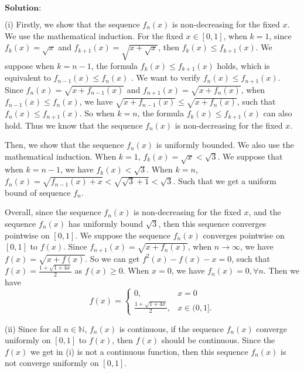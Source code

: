 \documentclass[12pt]{article}
\begin{document}
\vspace{8pt}
$\textbf{Solution:}$

(i) Firstly, we show that the sequence $f_{n}(x)$ is non-decreasing for the fixed $x$. We use the mathematical induction. For the fixed $x \in [0, 1]$, when $k = 1$, since $f_{k} (x) = \sqrt{x}$ and $f_{k+1} (x) = \sqrt{x + \sqrt{x}}$, then $f_{k}(x) \leq f_{k+1}(x)$. We suppose when $k = n-1$, the formula $f_{k}(x) \leq f_{k+1}(x)$ holds, which is equivalent to $f_{n-1}(x) \leq f_{n}(x)$ . We want to verify $f_{n}(x) \leq f_{n+1}(x)$. Since $f_{n}(x) = \sqrt{x + f_{n-1}(x)}$ and $f_{n+1}(x) = \sqrt{x + f_{n}(x)}$, when $f_{n-1}(x) \leq f_{n}(x)$, we have $\sqrt{x + f_{n-1}(x)} \leq \sqrt{x + f_{n}(x)}$, such that $f_{n}(x) \leq f_{n+1}(x)$. So when $k = n$, the formula $f_{k}(x) \leq f_{k+1}(x)$ can also hold. Thus we know that the sequence $f_{n}(x)$ is non-decreasing for the fixed $x$.

Then, we show that the sequence $f_{n}(x)$ is uniformly bounded. We also use the mathematical induction. When $k =1$, $f_{k}(x) = \sqrt{x} < \sqrt{3}$. We suppose that when $k = n-1$, we have $f_{k}(x) < \sqrt{3}$. When $k =n$, $f_{n}(x) = \sqrt{f_{n-1}(x) + x} < \sqrt{\sqrt{3}+1} < \sqrt{3}$. Such that we get a uniform bound of sequence $f_{n}$.

Overall, since the sequence $f_{n}(x)$ is non-decreasing for the fixed $x$, and the sequence $f_{n}(x)$ has uniformly bound $\sqrt{3}$, then this sequence converges pointwise on $[0, 1]$. We suppose the sequence $f_{n}(x)$ converges pointwise on $[0, 1]$ to $f(x)$. Since $f_{n+1}(x) = \sqrt{x + f_{n}(x)}$, when $n \to \infty$, we have $f(x) = \sqrt{x + f(x)}$. So we can get $f^{2}(x) - f(x) - x = 0$, such that $f(x) = \frac{1 + \sqrt{1 + 4 x}}{2}$ as $f(x) \geq 0$. When $x =  0$, we have $f_{n} (x) = 0, \forall n$. Then we have
\begin{equation*}
f(x) =
\left\{
             \begin{array}{cl}
             0, & x = 0 \\
             \frac{1 + \sqrt{1 + 4 x}}{2}, & x \in (0, 1].
             \end{array}
\right.
\end{equation*}

(ii) Since for all $n \in \mathbb{N}$, $ f_{n}(x)$ is continuous, if the sequence $f_{n}(x)$ converge uniformly on $[0, 1]$ to $f(x)$, then $f(x)$ should be continuous. Since the $f(x)$ we get in (i) is not a continuous function, then this sequence $f_{n}(x)$ is not converge uniformly on $[0, 1]$.
\end{document}
